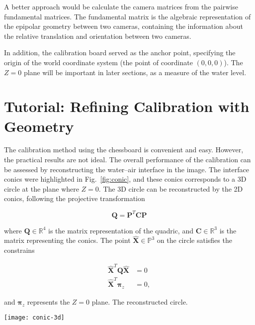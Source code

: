 \documentclass[11pt,twoside]{report}
\begin{document}
A better approach would be calculate the camera matrices from the pairwise fundamental matrices. The fundamental matrix is the algebraic representation of the epipolar geometry between two cameras, containing the information about the relative translation and orientation between two cameras. 


In addition, the calibration board served as the anchor point, specifying the origin of the world coordinate system (the point of coordinate $(0, 0, 0)$). The $Z=0$ plane will be important in later sections, as a measure of the water level.


\section{Tutorial: Refining Calibration with Geometry}

The calibration method using the chessboard is convenient and easy. However, the practical results are not ideal. The overall performance of the calibration can be assessed by reconstructing the water--air interface in the image. The interface conics were highlighted in Fig.\ \ref{fig:conic}, and these conics corresponds to a 3D circle at the plane where $Z=0$. The 3D circle can be reconstructed by the 2D conics, following the projective transformation

$$
\mathbf{Q} = \mathbf{P}^T \mathbf{C} \mathbf{P}
$$

\noindent where $\mathbf{Q} \in \mathbb{R}^4$ is the matrix representation of the quadric, and $\mathbf{C} \in \mathbb{R}^3$ is the matrix representing the conics. The point $\hat{\mathbf{X}} \in \mathbb{P}^3$ on the circle satisfies the constrains

$$
\begin{aligned}
\hat{\mathbf{X}}^T \mathbf{Q} \hat{\mathbf{X}} &= 0 \\
\hat{\mathbf{X}}^T \boldsymbol{\pi}_z &= 0,
\end{aligned}
$$

\noindent and $\boldsymbol{\pi}_z$ represents the $Z=0$ plane. The reconstructed circle.


\begin{SCfigure}
  \texttt{[image: conic-3d]}
  \caption{The conic features measured from the undistorted image. These feature points were fitted to get the conic matrices ($\mathbf{C}_{j}^{i}$ for the $j$th circle in camera $i$).}
  \label{fig:conic}
\end{SCfigure}
\end{document}

